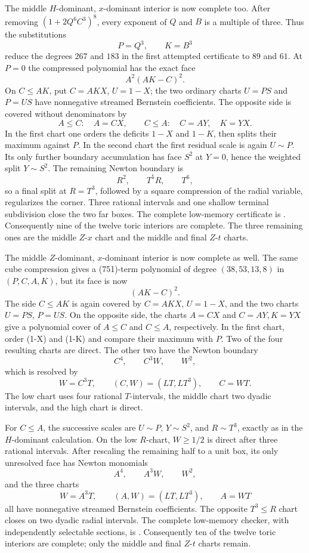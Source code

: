 \documentclass[11pt]{article}
\theoremstyle{remark}
\begin{document}
The middle \(H\)-dominant, \(x\)-dominant interior is now complete too.
After removing \((1+2Q^6C^3)^8\), every exponent of \(Q\) and \(B\) is a
multiple of three.  Thus the substitutions
\[
                         P=Q^3,\qquad K=B^3
\]
reduce the degrees \(267\) and \(183\) in the first attempted certificate to
\(89\) and \(61\).  At \(P=0\) the compressed polynomial has the exact face
\[
                         A^2(AK-C)^2.
\]
On \(C\leq AK\), put \(C=AKX\), \(U=1-X\); the two ordinary charts
\(U=PS\) and \(P=US\) have nonnegative streamed Bernstein coefficients.
The opposite side is covered without denominators by
\[
 A\leq C:\quad A=CX,\qquad
 C\leq A:\quad C=AY,\quad K=YX.
\]
In the first chart one orders the deficits \(1-X\) and \(1-K\), then splits
their maximum against \(P\).  In the second chart the first residual scale
is again \(U\sim P\).  Its only further boundary accumulation has face
\(S^2\) at \(Y=0\), hence the weighted split \(Y\sim S^2\).  The remaining
Newton boundary is
\[
                         R^2,\qquad T^5R,\qquad T^6,
\]
so a final split at \(R=T^3\), followed by a square compression of the radial
variable, regularizes the corner.  Three rational intervals and one shallow
terminal subdivision close the two far boxes.  The complete low-memory
certificate is
.
Consequently nine of the twelve toric interiors are complete.  The three
remaining ones are the middle \(Z\)-\(x\) chart and the middle and final
\(Z\)-\(t\) charts.

The middle \(Z\)-dominant, \(x\)-dominant interior is now complete as well.
The same cube compression gives a (751)-term polynomial of degree
\((38,53,13,8)\) in \((P,C,A,K)\), but its face is now
\[
                              (AK-C)^2.
\]
The side \(C\leq AK\) is again covered by \(C=AKX\), \(U=1-X\), and the
two charts \(U=PS\), \(P=US\).  On the opposite side, the charts \(A=CX\)
and \(C=AY, K=YX\) give a polynomial cover of \(A\leq C\) and \(C\leq A\),
respectively.  In the first chart, order (1-X) and (1-K) and compare
their maximum with \(P\).  Two of the four resulting charts are direct.
The other two have the Newton boundary
\[
                         C^4,\qquad C^3W,\qquad W^2,
\]
which is resolved by
\[
 W=C^3T,\qquad (C,W)=(LT,LT^3),\qquad C=WT.
\]
The low chart uses four rational \(T\)-intervals, the middle chart two
dyadic intervals, and the high chart is direct.

For \(C\leq A\), the successive scales are \(U\sim P\), \(Y\sim S^2\),
and \(R\sim T^3\), exactly as in the \(H\)-dominant calculation.  On the
low \(R\)-chart, \(W\geq1/2\) is direct after three rational intervals.
After rescaling the remaining half to a unit box, its only unresolved face
has Newton monomials
\[
                         A^4,\qquad A^3W,\qquad W^2,
\]
and the three charts
\[
 W=A^3T,\qquad (A,W)=(LT,LT^3),\qquad A=WT
\]
all have nonnegative streamed Bernstein coefficients.  The opposite
\(T^3\leq R\) chart closes on two dyadic radial intervals.  The complete
low-memory checker, with independently selectable sections, is
.  Consequently ten
of the twelve toric interiors are complete; only the middle and final
\(Z\)-\(t\) charts remain.
\end{document}
